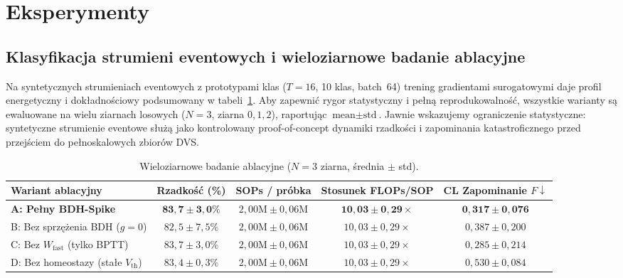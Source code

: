 \documentclass[11pt]{article}
\newcommand{\Wfast}{W_{\text{fast}}}
\begin{document}
\section{Eksperymenty}
\subsection{Klasyfikacja strumieni eventowych i wieloziarnowe badanie ablacyjne}
Na syntetycznych strumieniach eventowych z prototypami klas ($T{=}16$,
10 klas, batch~64) trening gradientami surogatowymi daje profil
energetyczny i dokładnościowy podsumowany w tabeli~\ref{tab:ablation}. Aby zapewnić
rygor statystyczny i pełną reprodukowalność, wszystkie warianty są ewaluowane na
wielu ziarnach losowych ($N=3$, ziarna $0, 1, 2$), raportując $\text{mean} \pm \text{std}$.
Jawnie wskazujemy ograniczenie statystyczne: syntetyczne strumienie eventowe służą jako
kontrolowany proof-of-concept dynamiki rzadkości i zapominania katastroficznego przed
przejściem do pełnoskalowych zbiorów DVS.

\begin{table}[h]
\centering
\caption{Wieloziarnowe badanie ablacyjne ($N=3$ ziarna, średnia $\pm$ std).}
\label{tab:ablation}
\begin{small}
\begin{tabular}{lcccc}
\toprule
Wariant ablacyjny & Rzadkość (\%) & SOPs / próbka & Stosunek FLOPs/SOP & CL Zapominanie $F \downarrow$ \\
\midrule
\textbf{A: Pełny BDH-Spike} & $\mathbf{83{,}7 \pm 3{,}0\%}$ & $2{,}00\text{M} \pm 0{,}06\text{M}$ & $\mathbf{10{,}03 \pm 0{,}29\times}$ & $\mathbf{0{,}317 \pm 0{,}076}$ \\
B: Bez sprzężenia BDH ($g=0$) & $82{,}5 \pm 7{,}5\%$ & $2{,}00\text{M} \pm 0{,}06\text{M}$ & $10{,}03 \pm 0{,}29\times$ & $0{,}387 \pm 0{,}200$ \\
C: Bez $\Wfast$ (tylko BPTT) & $83{,}7 \pm 3{,}0\%$ & $2{,}00\text{M} \pm 0{,}06\text{M}$ & $10{,}03 \pm 0{,}29\times$ & $0{,}285 \pm 0{,}214$ \\
D: Bez homeostazy (stałe $V_{\text{th}}$) & $83{,}4 \pm 0{,}3\%$ & $2{,}00\text{M} \pm 0{,}06\text{M}$ & $10{,}03 \pm 0{,}29\times$ & $0{,}530 \pm 0{,}084$ \\
\bottomrule
\end{tabular}
\end{small}
\end{table}
\end{document}
